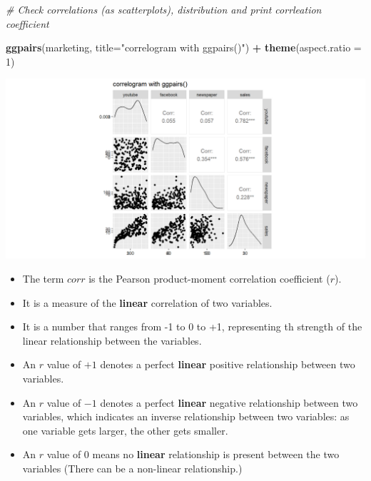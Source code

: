 \documentclass[
]{book}
\newenvironment{Shaded}{\begin{snugshade}}{\end{snugshade}}
\newcommand{\AttributeTok}[1]{\textcolor[rgb]{0.13,0.29,0.53}{#1}}
\newcommand{\CommentTok}[1]{\textcolor[rgb]{0.56,0.35,0.01}{\textit{#1}}}
\newcommand{\DecValTok}[1]{\textcolor[rgb]{0.00,0.00,0.81}{#1}}
\newcommand{\FunctionTok}[1]{\textcolor[rgb]{0.13,0.29,0.53}{\textbf{#1}}}
\newcommand{\NormalTok}[1]{#1}
\newcommand{\SpecialCharTok}[1]{\textcolor[rgb]{0.81,0.36,0.00}{\textbf{#1}}}
\newcommand{\StringTok}[1]{\textcolor[rgb]{0.31,0.60,0.02}{#1}}
\providecommand{\tightlist}{%
  \setlength{\itemsep}{0pt}\setlength{\parskip}{0pt}}
\begin{document}
\begin{Shaded}
\begin{Highlighting}[]
\CommentTok{\# Check correlations (as scatterplots), distribution and print corrleation coefficient }

\FunctionTok{ggpairs}\NormalTok{(marketing, }\AttributeTok{title=}\StringTok{"correlogram with ggpairs()"}\NormalTok{) }\SpecialCharTok{+}
   \FunctionTok{theme}\NormalTok{(}\AttributeTok{aspect.ratio =} \DecValTok{1}\NormalTok{)}
\end{Highlighting}
\end{Shaded}

\begin{center}\includegraphics{figure/unnamed-chunk-27-1} \end{center}

\begin{itemize}
\tightlist
\item
  The term \(corr\) is the Pearson product-moment correlation coefficient (\(r\)).
\item
  It is a measure of the \textbf{linear} correlation of two variables.
\item
  It is a number that ranges from -1 to 0 to +1, representing th strength of the linear relationship between the variables.
\item
  An \(r\) value of \(+1\) denotes a perfect \textbf{linear} positive relationship between two variables.
\item
  An \(r\) value of \(-1\) denotes a perfect \textbf{linear} negative relationship between two variables, which indicates an inverse relationship between two variables: as one variable gets larger, the other gets smaller.
\item
  An \(r\) value of 0 means no \textbf{linear} relationship is present between the two variables (There can be a non-linear relationship.)
\end{itemize}
\end{document}
